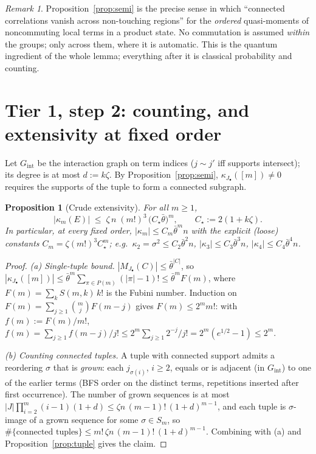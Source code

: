 \documentclass[11pt]{article}
\newtheorem{proposition}{Proposition}
\theoremstyle{remark}
\newtheorem{remark}{Remark}
\begin{document}
\begin{remark}
Proposition~\ref{prop:semi} is the precise sense in which ``connected
correlations vanish across non-touching regions'' for the \emph{ordered}
quasi-moments of noncommuting local terms in a product state. No
commutation is assumed \emph{within} the groups; only across them, where it
is automatic. This is the quantum ingredient of the whole lemma; everything
after it is classical probability and counting.
\end{remark}

\section{Tier 1, step 2: counting, and extensivity at fixed order}

Let $G_{\mathrm{int}}$ be the interaction graph on term indices ($j\sim j'$
iff supports intersect); its degree is at most $d:=k\zeta$. By
Proposition~\ref{prop:semi}, $\kappa_{J_\bullet}([m])\ne0$ requires the
supports of the tuple to form a connected subgraph.

\begin{proposition}[Crude extensivity]\label{prop:count}
For all $m\ge1$,
\[
|\kappa_m(E)|\;\le\;\zeta\,n\;(m!)^3\,\big(C_\star\bar\theta\big)^m,
\qquad C_\star:=2(1+k\zeta).
\]
In particular, at every fixed order, $|\kappa_m|\le C_m\bar\theta^m n$ with
the explicit (loose) constants $C_m=\zeta(m!)^3C_\star^m$; e.g.\
$\kappa_2=\sigma^2\le C_2\bar\theta^2n$, $|\kappa_3|\le C_3\bar\theta^3n$,
$|\kappa_4|\le C_4\bar\theta^4 n$.
\end{proposition}

\begin{proof}
\emph{(a) Single-tuple bound.} $|M_{J_\bullet}(C)|\le\bar\theta^{|C|}$, so
$|\kappa_{J_\bullet}([m])|\le\bar\theta^m\sum_{\pi\in P(m)}(|\pi|-1)!
\le\bar\theta^m F(m)$, where $F(m)=\sum_k S(m,k)\,k!$ is the Fubini number.
Induction on $F(m)=\sum_{j\ge1}\binom mj F(m-j)$ gives
$F(m)\le 2^m m!$: with $f(m):=F(m)/m!$, $f(m)=\sum_{j\ge1}f(m-j)/j!\le
2^m\sum_{j\ge1}2^{-j}/j!=2^m(e^{1/2}-1)\le 2^m$.

\emph{(b) Counting connected tuples.} A tuple with connected support admits
a reordering $\sigma$ that is \emph{grown}: each $j_{\sigma(i)}$, $i\ge2$,
equals or is adjacent (in $G_{\mathrm{int}}$) to one of the earlier terms
(BFS order on the distinct terms, repetitions inserted after first
occurrence). The number of grown sequences is at most
$|J|\prod_{i=2}^m (i-1)(1+d)\le\zeta n\,(m-1)!\,(1+d)^{m-1}$, and each tuple
is $\sigma$-image of a grown sequence for some $\sigma\in S_m$, so
$\#\{\text{connected tuples}\}\le m!\,\zeta n\,(m-1)!\,(1+d)^{m-1}$.
Combining with (a) and Proposition~\ref{prop:tuple} gives the claim.
\end{proof}
\end{document}
